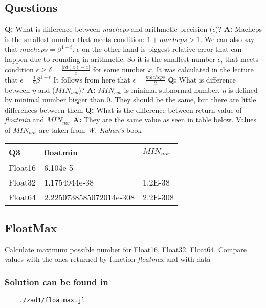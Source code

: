 \documentclass[12pt]{article}
\begin{document}
\subsection{Questions}
\textbf{Q:} What is difference between \emph{macheps} and arithmetic precision ($\epsilon$)? \newline
\textbf{A:} Macheps is the smallest number that meets condition: $1+macheps > 1$. We can also say that $macheps=\beta^{1-t}$.  
$\epsilon$ on the other hand is biggest relative error that can happen due to rounding 
in arithmetic. So it is the smallest number $\epsilon$, 
that meets condition  $ \epsilon \geq \delta = \frac{|rd(x) - x|}{x}$ for some number $x$. It was calculated in the lecture that $\epsilon = \frac{1}{2}\beta^{1-t}$ 
\newline It follows from here that $\epsilon = \frac{macheps}{2}$
\newline
\textbf{Q:} What is difference between $\eta$ and ($MIN_{sub}$)? \newline
\textbf{A:} $MIN_{sub}$ is minimal subnormal number. $\eta$ is defined by minimal number bigger than 0. They should be the same, but there are little differences between them
\textbf{Q:} What is the difference between return value of \emph{floatmin} and $MIN_{nor}$ \newline
\textbf{A:} They are the same value as seen in table below. Values of $MIN_{nor}$ are taken from \emph{W. Kahan's} book
\begin{table}[!ht]
    \centering
    \begin{tabular}{|l|l|l|}
    \hline
        Q3 & floatmin & $MIN_{nor}$ \\ \hline
        Float16 & 6.104e-5 & ~ \\ \hline
        Float32 & 1.1754944e-38 & 1.2E-38 \\ \hline
        Float64 & 2.2250738585072014e-308 & 2.2E-308 \\ \hline
    \end{tabular}
\end{table}
\subsection{FloatMax}
Calculate maximum possible number for Float16, Float32, Float64. 
Compare values with the ones returned by function \emph{floatmax} and with data 
\subsubsection*{Solution can be found in}
\begin{verbatim}
    ./zad1/floatmax.jl
\end{verbatim}
\end{document}
